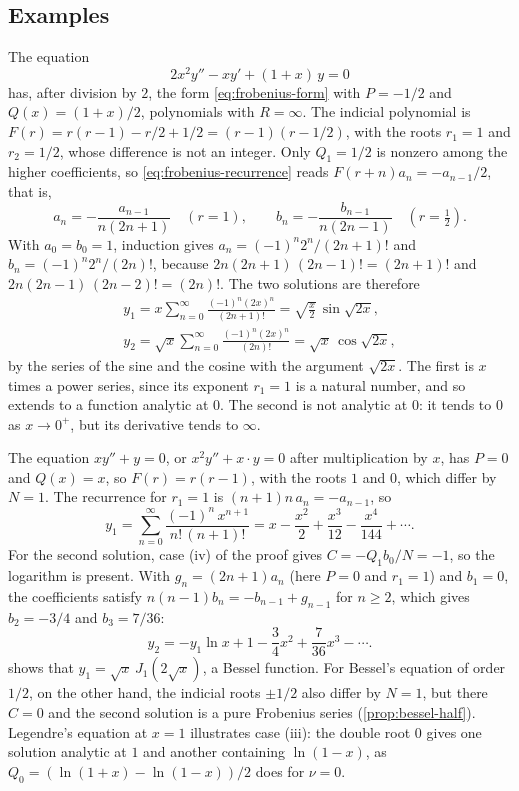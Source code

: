 \subsection{Examples}

The equation
\[
2x^2y''-xy'+(1+x)\,y=0
\]
has, after division by $2$, the form \eqref{eq:frobenius-form} with $P=-1/2$ and $Q(x)=(1+x)/2$, polynomials with $R=\infty$. The indicial polynomial is $F(r)=r(r-1)-r/2+1/2=(r-1)(r-1/2)$, with the roots $r_1=1$ and $r_2=1/2$, whose difference is not an integer. Only $Q_1=1/2$ is nonzero among the higher coefficients, so \eqref{eq:frobenius-recurrence} reads $F(r+n)a_n=-a_{n-1}/2$, that is,
\[
a_n=-\frac{a_{n-1}}{n(2n+1)}\quad(r=1),\qquad b_n=-\frac{b_{n-1}}{n(2n-1)}\quad(r=\tfrac12).
\]
With $a_0=b_0=1$, induction gives $a_n=(-1)^n2^n/(2n+1)!$ and $b_n=(-1)^n2^n/(2n)!$, because $2n(2n+1)\,(2n-1)!=(2n+1)!$ and $2n(2n-1)\,(2n-2)!=(2n)!$. The two solutions are therefore
\begin{gather*}
y_1=x\sum_{n=0}^\infty\frac{(-1)^n(2x)^n}{(2n+1)!}=\sqrt{\frac x2}\,\sin\sqrt{2x},\\
y_2=\sqrt x\sum_{n=0}^\infty\frac{(-1)^n(2x)^n}{(2n)!}=\sqrt x\,\cos\sqrt{2x},
\end{gather*}
by the series of the sine and the cosine with the argument $\sqrt{2x}$. The first is $x$ times a power series, since its exponent $r_1=1$ is a natural number, and so extends to a function analytic at $0$. The second is not analytic at $0$: it tends to $0$ as $x\to0^+$, but its derivative tends to $\infty$.

The equation $xy''+y=0$, or $x^2y''+x\cdot y=0$ after multiplication by $x$, has $P=0$ and $Q(x)=x$, so $F(r)=r(r-1)$, with the roots $1$ and $0$, which differ by $N=1$. The recurrence for $r_1=1$ is $(n+1)n\,a_n=-a_{n-1}$, so
\[
y_1=\sum_{n=0}^\infty\frac{(-1)^n\,x^{n+1}}{n!\,(n+1)!}=x-\frac{x^2}2+\frac{x^3}{12}-\frac{x^4}{144}+\cdots .
\]
For the second solution, case (iv) of the proof gives $C=-Q_1b_0/N=-1$, so the logarithm is present. With $g_n=(2n+1)a_n$ (here $P=0$ and $r_1=1$) and $b_1=0$, the coefficients satisfy $n(n-1)b_n=-b_{n-1}+g_{n-1}$ for $n\ge2$, which gives $b_2=-3/4$ and $b_3=7/36$:
\[
y_2=-y_1\ln x+1-\frac34x^2+\frac7{36}x^3-\cdots .
\]
 shows that $y_1=\sqrt x\,J_1(2\sqrt x)$, a Bessel function. For Bessel's equation of order $1/2$, on the other hand, the indicial roots $\pm1/2$ also differ by $N=1$, but there $C=0$ and the second solution is a pure Frobenius series (\cref{prop:bessel-half}). Legendre's equation at $x=1$ illustrates case (iii): the double root $0$ gives one solution analytic at $1$ and another containing $\ln(1-x)$, as $Q_0=(\ln(1+x)-\ln(1-x))/2$ does for $\nu=0$.

